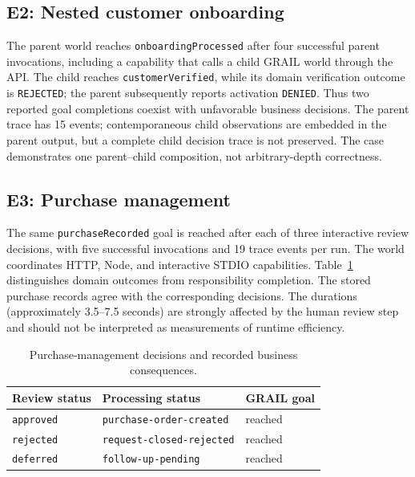 \documentclass[11pt]{article}
\begin{document}
\subsection{E2: Nested customer onboarding}
The parent world reaches \texttt{onboardingProcessed} after four successful parent invocations, including a capability that calls a child GRAIL world through the API. The child reaches \texttt{customerVerified}, while its domain verification outcome is \texttt{REJECTED}; the parent subsequently reports activation \texttt{DENIED}. Thus two reported goal completions coexist with unfavorable business decisions. The parent trace has 15 events; contemporaneous child observations are embedded in the parent output, but a complete child decision trace is not preserved. The case demonstrates one parent--child composition, not arbitrary-depth correctness.

\subsection{E3: Purchase management}
The same \texttt{purchaseRecorded} goal is reached after each of three interactive review decisions, with five successful invocations and 19 trace events per run. The world coordinates HTTP, Node, and interactive STDIO capabilities. Table~\ref{tab:purchase} distinguishes domain outcomes from responsibility completion. The stored purchase records agree with the corresponding decisions. The durations (approximately 3.5--7.5 seconds) are strongly affected by the human review step and should not be interpreted as measurements of runtime efficiency.

\begin{table}[ht]
\centering\small
\caption{Purchase-management decisions and recorded business consequences.}
\label{tab:purchase}
\begin{tabular}{@{}lll@{}}
\toprule
Review status & Processing status & GRAIL goal \\
\midrule
\texttt{approved} & \texttt{purchase-order-created} & reached \\
\texttt{rejected} & \texttt{request-closed-rejected} & reached \\
\texttt{deferred} & \texttt{follow-up-pending} & reached \\
\bottomrule
\end{tabular}
\end{table}
\end{document}
